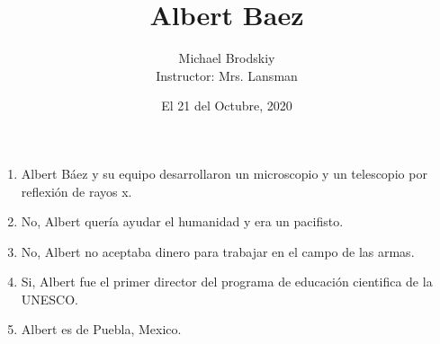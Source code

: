 \documentclass[12pt]{article}
\title{Albert Baez}
\date{El 21 del Octubre, 2020}
\author{Michael Brodskiy\\ \small Instructor: Mrs. Lansman}
\begin{document}
\maketitle

\begin{enumerate}

  \item Albert B\'aez y su equipo desarrollaron un microscopio y un telescopio por reflexi\'on de rayos x.

  \item No, Albert quer\'ia ayudar el humanidad y era un pacifisto.

  \item No, Albert no aceptaba dinero para trabajar en el campo de las armas.

  \item Si, Albert fue el primer director del programa de educaci\'on cientifica de la UNESCO.

  \item Albert es de Puebla, Mexico.

\end{enumerate}
\end{document}
